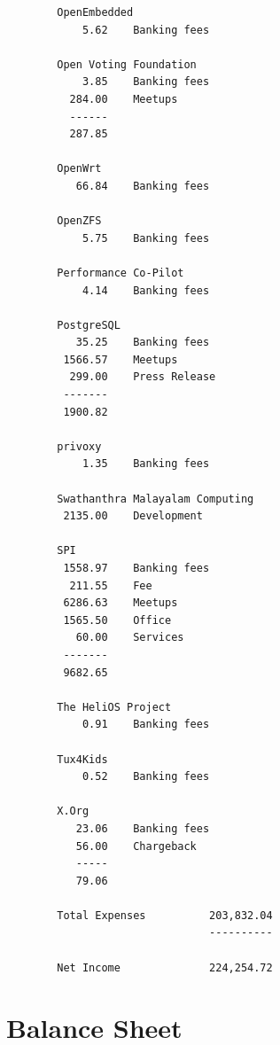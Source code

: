 \documentclass[letterpaper]{report}
\begin{document}
\begin{verbatim}
        OpenEmbedded
            5.62    Banking fees

        Open Voting Foundation
            3.85    Banking fees
          284.00    Meetups
          ------
          287.85

        OpenWrt
           66.84    Banking fees

        OpenZFS
            5.75    Banking fees

        Performance Co-Pilot
            4.14    Banking fees

        PostgreSQL
           35.25    Banking fees
         1566.57    Meetups
          299.00    Press Release
         -------
         1900.82

        privoxy
            1.35    Banking fees

        Swathanthra Malayalam Computing
         2135.00    Development

        SPI
         1558.97    Banking fees
          211.55    Fee
         6286.63    Meetups
         1565.50    Office
           60.00    Services
         -------
         9682.65

        The HeliOS Project
            0.91    Banking fees

        Tux4Kids
            0.52    Banking fees

        X.Org
           23.06    Banking fees
           56.00    Chargeback
           -----
           79.06

        Total Expenses          203,832.04
                                ----------

        Net Income              224,254.72
\end{verbatim}

\section{Balance Sheet}
\end{document}

